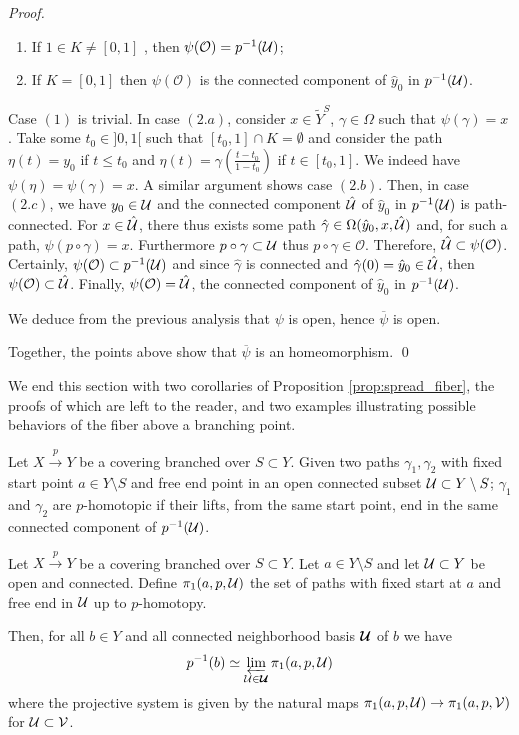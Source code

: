 \begin{proof}
\begin{itemize}
\begin{enumerate}
\begin{enumerate}
     
     \item If $1\in K\neq [0,1]$ , then $\psi(\mathcal O)= p^{-1}(\mathcal{U})$;
     \item If $K = [0,1]$ then $\psi(\mathcal O)$ is the connected component of $\hat y_0$ in $p^{-1}(\mathcal{U})$.
    \end{enumerate}
\end{enumerate}
Case $(1)$ is trivial. In case $(2.a)$, consider $x\in \widetilde Y^S$, $\gamma\in \Omega$ such that $\psi(\gamma)=x$. Take some $t_0\in ]0,1[$ such that $[t_0,1]\cap K = \emptyset$ and consider the path $\eta(t)=y_0$ if $t\leq t_0$ and 
$\eta(t)=\gamma(\frac{t-t_0}{1-t_0})$ if $t\in [t_0,1]$. We indeed have $\psi(\eta)=\psi(\gamma)=x$. A similar argument shows case $(2.b)$. 
Then, in case $(2.c)$, we have $y_0\in \mathcal{U}$ and the connected component $\hat{\mathcal{U}}$ of $\hat y_0$ in $p^{-1}(\mathcal{U})$  is path-connected. For $x\in \hat{\mathcal{U}}$, there thus exists some path $\hat\gamma \in \Omega(\hat y_0,x,\hat {\mathcal{U}})$ and, for such a path, $\psi(p\circ \gamma)=x$. Furthermore $p\circ \gamma\subset \mathcal{U}$ thus $p\circ \gamma\in \mathcal O$. Therefore, $\hat {\mathcal{U}} \subset \psi(\mathcal O)$. Certainly, $\psi(\mathcal O)\subset p^{-1}(\mathcal{U})$ and since $\hat\gamma$ is connected and $\hat\gamma(0)=\hat y_0\in \hat{\mathcal{U}}$, then $\psi(\mathcal O)\subset \hat {\mathcal{U}}$.
Finally, $\psi(\mathcal O)=\hat {\mathcal{U}}$, the connected component of $\hat y_0$ in $p^{-1}(\mathcal{U})$.

We deduce from the previous analysis that $\psi$ is open, hence $\overline \psi$ is open.
\end{itemize}
Together, the points above show that $\overline \psi$ is an homeomorphism.
\qed\end{proof}

We end this section with two corollaries of Proposition \ref{prop:spread_fiber}, the proofs of which are left to the reader, and two examples illustrating possible behaviors of the fiber above a branching point. 
\begin{defi} 
 Let $X\xrightarrow{p} Y$ be a  covering branched over $S\subset Y$. 
 Given two paths $\gamma_1,\gamma_2$ with fixed start point $a\in Y\setminus S$ and free end point in an open connected subset $\mathcal{U}\subset Y\setminus S$; $\gamma_1$ and $\gamma_2$ are $p$-homotopic if their lifts, from the same start point, end in the same connected component of $p^{-1}(\mathcal{U})$.
\end{defi}

  \begin{prop} \label{prop:general_fiber_path}
  Let $X\xrightarrow{p} Y$ be a  covering branched over $S\subset Y$. Let $a\in Y\setminus S$ and let $\mathcal{U}\subset Y$ be open and connected.  Define
$\pi_1(a,p,\mathcal{U})$ the set of paths with fixed start at $a$ and free end in $\mathcal{U}$ up to $p$-homotopy.

Then, for all $b\in Y$ and all connected neighborhood basis $\boldsymbol {\mathcal{U}}$ of $b$ we have 
  $$ p^{-1}(b) \simeq \varprojlim_{\mathcal{U}\in \boldsymbol{\mathcal{U}}} \pi_1(a,p,\mathcal{U})$$
  where the projective system is given by the natural maps $\pi_1(a,p,\mathcal{U})\rightarrow \pi_1(a,p,\mathcal V)$  for $\mathcal{U}\subset \mathcal V$.
\end{prop}

